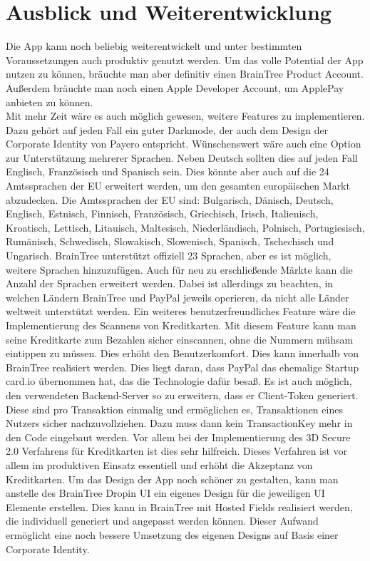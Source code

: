 
\chapter{Ausblick und Weiterentwicklung}

Die App kann noch beliebig weiterentwickelt und unter bestimmten Voraussetzungen auch produktiv genutzt werden.
Um das volle Potential der App nutzen zu können, bräuchte man aber definitiv einen BrainTree Product Account.
Außerdem bräuchte man noch einen Apple Developer Account, um ApplePay anbieten zu können.\\
Mit mehr Zeit wäre es auch möglich gewesen, weitere Features zu implementieren.
Dazu gehört auf jeden Fall ein guter Darkmode, der auch dem Design der Corporate Identity von \glqq Payero\grqq{} entspricht.
Wünschenswert wäre auch eine Option zur Unterstützung mehrerer Sprachen.
Neben Deutsch sollten dies auf jeden Fall Englisch, Französisch und Spanisch sein.
Dies könnte aber auch auf die 24 Amtssprachen der EU erweitert werden, um den gesamten europäischen Markt abzudecken.
Die Amtssprachen der EU sind: Bulgarisch, Dänisch, Deutsch, Englisch, Estnisch, Finnisch, Französisch, Griechisch, Irisch, Italienisch, Kroatisch, Lettisch, Litauisch, Maltesisch, Niederländisch, Polnisch, Portugiesisch, Rumänisch, Schwedisch, Slowakisch, Slowenisch, Spanisch, Tschechisch und Ungarisch.
BrainTree unterstützt offiziell 23 Sprachen, aber es ist möglich, weitere Sprachen hinzuzufügen.
Auch für neu zu erschließende Märkte kann die Anzahl der Sprachen erweitert werden.
Dabei ist allerdings zu beachten, in welchen Ländern BrainTree und PayPal jeweils operieren, da nicht alle Länder weltweit unterstützt werden.
Ein weiteres benutzerfreundliches Feature wäre die Implementierung des Scannens von Kreditkarten.
Mit diesem Feature kann man seine Kreditkarte zum Bezahlen sicher einscannen, ohne die Nummern mühsam eintippen zu müssen.
Dies erhöht den Benutzerkomfort.
Dies kann innerhalb von BrainTree realisiert werden.
Dies liegt daran, dass PayPal das ehemalige Startup card.io übernommen hat, das die Technologie dafür besaß.
Es ist auch möglich, den verwendeten Backend-Server so zu erweitern, dass er Client-Token generiert.
Diese sind pro Transaktion einmalig und ermöglichen es, Transaktionen eines Nutzers sicher nachzuvollziehen.
Dazu muss dann kein TransactionKey mehr in den Code eingebaut werden.
Vor allem bei der Implementierung des 3D Secure 2.0 Verfahrens für Kreditkarten ist dies sehr hilfreich.
Dieses Verfahren ist vor allem im produktiven Einsatz essentiell und erhöht die Akzeptanz von Kreditkarten.
Um das Design der App noch schöner zu gestalten, kann man anstelle des BrainTree Dropin UI ein eigenes Design für die jeweiligen UI Elemente erstellen.
Dies kann in BrainTree mit Hosted Fields realisiert werden, die individuell generiert und angepasst werden können.
Dieser Aufwand ermöglicht eine noch bessere Umsetzung des eigenen Designs auf Basis einer Corporate Identity.
